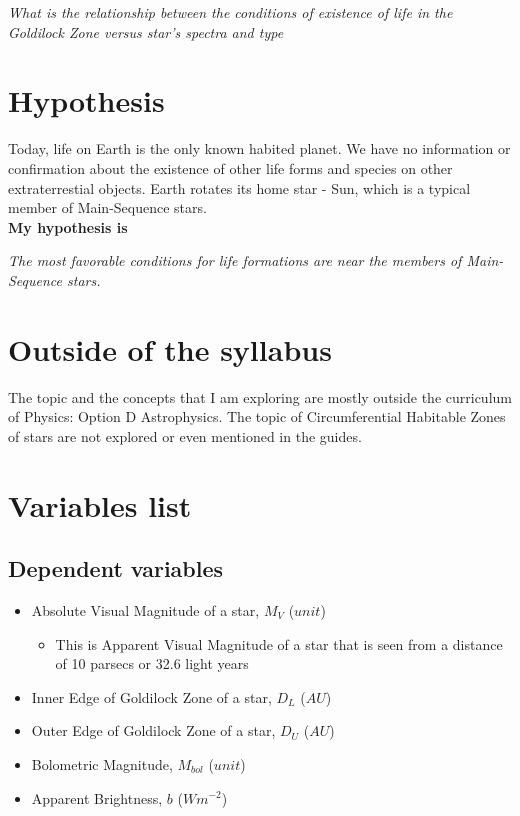 \documentclass[a4paper,12pt]{article}
\begin{document}
\textit{What is the relationship between the conditions of existence of life in the Goldilock Zone versus star's spectra and type }

\section{Hypothesis}

Today, life on Earth is the only known habited planet. We have no information or confirmation about the existence of other life forms and species on other extraterrestial objects. Earth rotates its home star - Sun, which is a typical member of Main-Sequence stars.\\

\textbf{My hypothesis is}

  \textit{The most favorable conditions for life formations are near the members of Main-Sequence stars.}

  \section{Outside of the syllabus}

  The topic and the concepts that I am exploring are mostly outside the curriculum of Physics: Option D Astrophysics. The topic of Circumferential Habitable Zones of stars are not explored or even mentioned in the guides.
  
  \newpage
  \onehalfspacing
  \section{Variables list}
  
  \subsection{Dependent variables}
  
  \begin{itemize}

  \item Absolute Visual Magnitude of a star, $M_V$ ($unit$)
    
    \begin{itemize}
      
    \item This is Apparent Visual Magnitude of a star that is seen from a distance of 10 parsecs or 32.6 light years
      
    \end{itemize}
    
  \item Inner Edge of Goldilock Zone of a star, $D_L$ ($AU$) 
    
  \item Outer Edge of Goldilock Zone of a star, $D_U$ ($AU$)
    
  \item Bolometric Magnitude, $M_{bol}$ ($unit$)
    
  \item Apparent Brightness, $b$ ($W m^{-2}$)
    
  \end{itemize}
  
\end{document}
